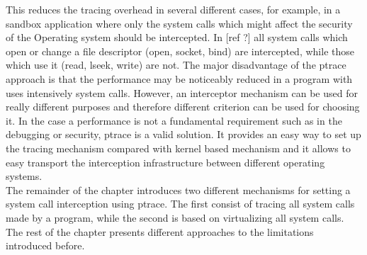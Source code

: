 This reduces the tracing overhead in several different cases, for example, in a sandbox application  where only the system calls which might affect the security of the Operating system should be intercepted. In [ref ?] all system calls which open or change a file descriptor (open, socket, bind) are intercepted, while those which use it (read, lseek, write) are not. 
The major disadvantage of the ptrace approach is that the performance may be noticeably reduced in a program with uses intensively system calls.  However, an interceptor mechanism can be used for really different purposes and therefore different criterion can be used for choosing it.  In the case a performance is not a fundamental requirement such as in the debugging or security, ptrace is a valid solution. It provides an easy way to set up the tracing mechanism compared with kernel based mechanism and it allows to easy transport the interception infrastructure between different operating systems.  \\
The remainder of the chapter introduces two different mechanisms for setting a system call interception using ptrace. The first consist of tracing all system calls made by a program, while the second is based on virtualizing all system calls. The rest of the chapter presents different approaches to the limitations introduced before.    \\

%

